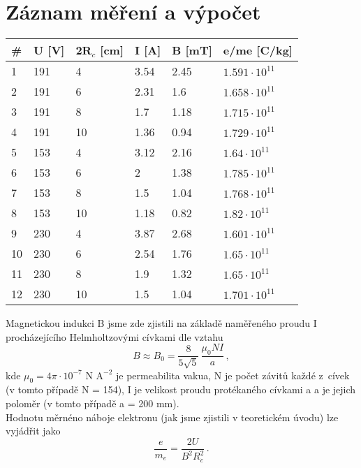 \documentclass{report}
\begin{document}
	\section*{Záznam měření a výpočet}
		\begin{center}
			\begin{tabular}{| m{0.5cm} | m{1.6cm} | m{1.6cm} | m{1.6cm} || m{1.6cm} | m{2cm} |}
				\hline
				\# & U [V] & 2R$_c$ [cm] & I [A] & B [mT] & e/me [C/kg] \\ [0.5ex]
				\hline\hline
				1 & 191 & 4 & 3.54 & 2.45 & $1.591 \cdot 10^{11}$ \\
				\hline
				2 & 191 & 6 & 2.31 & 1.6 & $1.658 \cdot 10^{11}$ \\
				\hline
				3 & 191 & 8 & 1.7 & 1.18 & $1.715 \cdot 10^{11}$ \\
				\hline
				4 & 191 & 10 & 1.36 & 0.94 & $1.729 \cdot 10^{11}$ \\
				\hline
				5 & 153 & 4 & 3.12 & 2.16 & $1.64 \cdot 10^{11}$ \\
				\hline
				6 & 153 & 6 & 2 & 1.38 & $1.785 \cdot 10^{11}$ \\
				\hline
				7 & 153 & 8 & 1.5 & 1.04 & $1.768 \cdot 10^{11}$ \\
				\hline
				8 & 153 & 10 & 1.18 & 0.82 & $1.82 \cdot 10^{11}$ \\
				\hline
				9 & 230 & 4 & 3.87 & 2.68 & $1.601 \cdot 10^{11}$ \\
				\hline
				10 & 230 & 6 & 2.54 & 1.76 & $1.65 \cdot 10^{11}$ \\
				\hline
				11 & 230 & 8 & 1.9 & 1.32 & $1.65 \cdot 10^{11}$ \\
				\hline
				12 & 230 & 10 & 1.5 & 1.04 & $1.701 \cdot 10^{11}$ \\
				\hline
			\end{tabular}
		\end{center}
		Magnetickou indukci B jsme zde zjistili na základě naměřeného proudu I procházejícího Helmholtzovými cívkami dle vztahu
		\begin{equation*}
			B \approx B_0 = \frac{8}{5\sqrt{5}} \, \frac{\mu_0 N I}{a} \, ,
		\end{equation*}
		kde $\mu_0 = 4 \pi \cdot 10^{-7} \text{ N A}^{-2}$ je permeabilita vakua, N je počet závitů každé z cívek (v tomto případě N = 154), I je velikost proudu protékaného cívkami a a je jejich poloměr (v tomto případě a = 200 mm). \\
		Hodnotu měrnéno náboje elektronu (jak jsme zjistili v teoretickém úvodu) lze vyjádřit jako
		\begin{equation*}
			\frac{e}{m_e} = \frac{2 U}{B^2 R_c^2} \, .
		\end{equation*}
\end{document}
